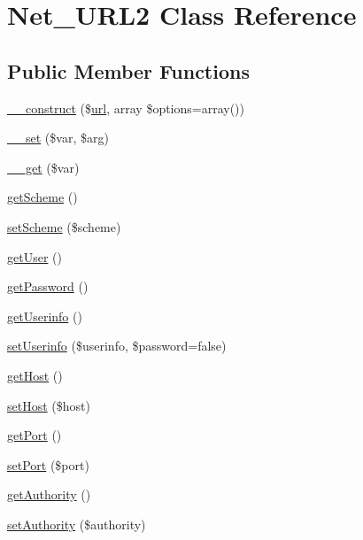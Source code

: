 \hypertarget{classNet__URL2}{}\section{Net\+\_\+\+U\+R\+L2 Class Reference}
\label{classNet__URL2}
\subsection*{Public Member Functions}
\begin{DoxyCompactItemize}
\item 
\hyperlink{classNet__URL2_a4c12ff0ddce6621148a4917b8040e567}{\+\_\+\+\_\+construct} (\$\hyperlink{swfupload_8js_a440a52a9004fdab0700100a6ddb49f67}{url}, array \$options=array())
\item 
\hyperlink{classNet__URL2_ae2489e2f59be30883c898bc46ffbf9a1}{\+\_\+\+\_\+set} (\$var, \$arg)
\item 
\hyperlink{classNet__URL2_a6f7109a2d04198fafac837cae9d5c3ff}{\+\_\+\+\_\+get} (\$var)
\item 
\hyperlink{classNet__URL2_a9ebbd0b1bc71024ce48593cb1faeff41}{get\+Scheme} ()
\item 
\hyperlink{classNet__URL2_aadd3865f996d98703ec9bbdecfda4ba1}{set\+Scheme} (\$scheme)
\item 
\hyperlink{classNet__URL2_ad06292db039e4723ce457f416fc61763}{get\+User} ()
\item 
\hyperlink{classNet__URL2_a8cfbc773d2c8bb6727da1526770c4b9a}{get\+Password} ()
\item 
\hyperlink{classNet__URL2_a9249aba1b6b07ac8f992033cc865a455}{get\+Userinfo} ()
\item 
\hyperlink{classNet__URL2_a0e71d3ae85320e8e3ee181b49a11721b}{set\+Userinfo} (\$userinfo, \$password=false)
\item 
\hyperlink{classNet__URL2_a55343faf36c62fb1942229c00c53e42c}{get\+Host} ()
\item 
\hyperlink{classNet__URL2_afacc7bf64786203c167c2d771f1fddf9}{set\+Host} (\$host)
\item 
\hyperlink{classNet__URL2_a3684482beddce2747c3ef0cb5c3e9c64}{get\+Port} ()
\item 
\hyperlink{classNet__URL2_a4086e17a9dc2744b451ed0e5cc6fe113}{set\+Port} (\$port)
\item 
\hyperlink{classNet__URL2_af736dde13f102618a706c1cb47868b38}{get\+Authority} ()
\item 
\hyperlink{classNet__URL2_a9da06e86831f84fa7fba91e81e051160}{set\+Authority} (\$authority)

\end{DoxyCompactItemize}
